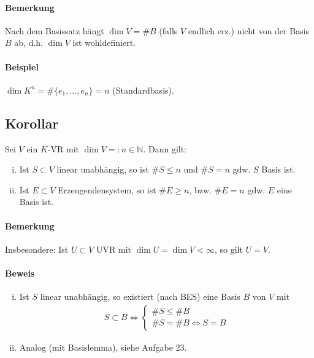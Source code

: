  	\paragraph{Bemerkung}
 		Nach dem Basissatz hängt $\dim V = \#B$ (falls $V$ endlich erz.) nicht von der Basis $B$ ab, d.h. $\dim V$ ist wohldefiniert.

 	\paragraph{Beispiel}
 		$\dim K^n = \#\{e_1,...,e_n\} = n$ (Standardbasis).

 \subsection{Korollar}
 	\begin{Korollar}
 		Sei $ V $ ein $ K $-VR mit $\dim V =: n\in \mathbb{N}$. Dann gilt:
 		\begin{enumerate}[(i)]
 			\item Ist $S \subset V$ linear unabhängig, so ist $\# S \leq n$ und $\# S = n$ gdw. $ S $ Basis ist.
 			\item Ist $E \subset V$ Erzeugendensystem, so ist $\#E \geq n$, bzw. $\#E = n$ gdw. $ E $ eine Basis ist.
 		\end{enumerate}
 	\end{Korollar}

 	\paragraph{Bemerkung}
 		Insbesondere: Ist $U\subset V$ UVR mit $\dim U=\dim V < \infty$, so gilt $ U=V $.

 	\paragraph{Beweis}
 		\begin{enumerate}[(i)]
 			\item Ist $ S $ linear unabhängig, so existiert (nach BES) eine Basis $ B $ von $ V $ mit
 			      \begin{gather*}
 			      	S\subset B\Leftrightarrow \left\{
 			      	\begin{array}{l}
 			      		\#S \leq \#B                    \\
 			      		\#S = \#B \Leftrightarrow S = B
 			      	\end{array}
 			      	\right.
 			      \end{gather*}
 			\item Analog (mit Basislemma), siehe Aufgabe 23.
 		\end{enumerate}
